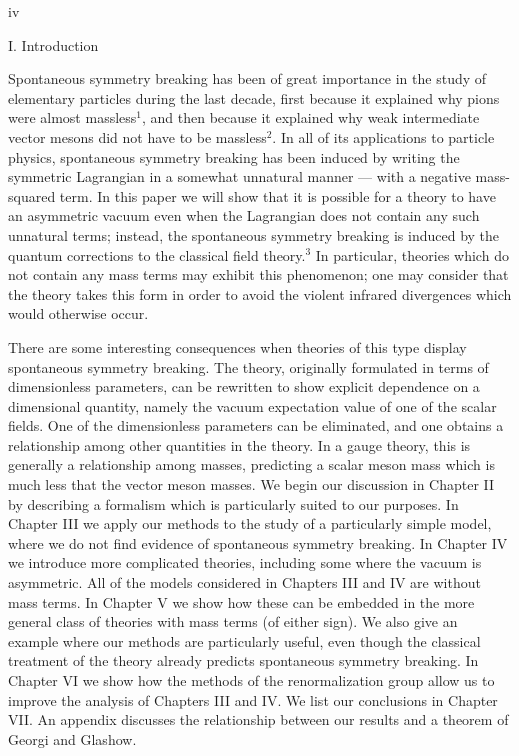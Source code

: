 \documentclass[12pt,epsf]{report}
\begin{document}
\thispagestyle{empty}
\setcounter{page}{0}

\vfill \centerline{iv} \eject



\centerline{I. Introduction}

\bigskip

Spontaneous symmetry breaking has been of great importance in the
study of elementary particles during the last decade, first because it
explained why pions were almost massless$^1$, and then because it
explained why weak intermediate vector mesons did not have to be
massless$^2$.  In all of its applications to particle physics,
spontaneous symmetry breaking has been induced by writing the
symmetric Lagrangian in a somewhat unnatural manner --- with a
negative mass-squared term.  In this paper we will show that it is
possible for a theory to have an asymmetric vacuum even when the
Lagrangian does not contain any such unnatural terms; instead, the
spontaneous symmetry breaking is induced by the quantum corrections to
the classical field theory.$^3$ In particular, theories which do not
contain any mass terms may exhibit this phenomenon; one may consider
that the theory takes this form in order to avoid the violent infrared
divergences which would otherwise occur.

There are some interesting consequences when theories of this type
display spontaneous symmetry breaking.  The theory, originally
formulated in terms of dimensionless parameters, can be rewritten to
show explicit dependence on a dimensional quantity, namely the vacuum
expectation value of one of the scalar fields.  One of the
dimensionless parameters can be eliminated, and one obtains a
relationship among other quantities in the theory.  In a gauge theory,
this is generally a relationship among masses, predicting a scalar
meson mass which is much less that the vector meson masses.  We begin
our discussion in Chapter II by describing a formalism which is
particularly suited to our purposes.  In Chapter III we apply our
methods to the study of a particularly simple model, where we do not
find evidence of spontaneous symmetry breaking.  In Chapter IV we
introduce more complicated theories, including some where the vacuum
is asymmetric.  All of the models considered in Chapters III and IV
are without mass terms.  In Chapter V we show how these can be
embedded in the more general class of theories with mass terms (of
either sign).  We also give an example where our methods are
particularly useful, even though the classical treatment of the theory
already predicts spontaneous symmetry breaking.  In Chapter VI we show
how the methods of the renormalization group allow us to improve the
analysis of Chapters III and IV.  We list our conclusions in Chapter
VII.  An appendix discusses the relationship between our results and a
theorem of Georgi and Glashow.
\end{document}
